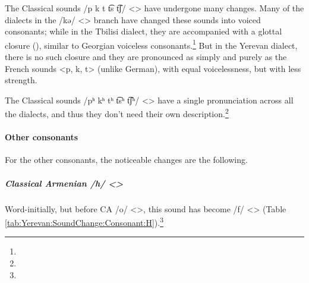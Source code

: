 The Classical sounds /p  k t t͡s t͡ʃ/ <> have undergone many changes. Many of the dialects in the /kə/ <> branch have changed these sounds into voiced consonants; while in the Tbilisi dialect, they are accompanied with a glottal closure (), similar to Georgian voiceless consonants.\footnote{} But in the Yerevan dialect, there is no such closure and they are pronounced as simply and purely as the French sounds <p, k, t> (unlike German), with equal voicelessness, but with less strength. 

The Classical sounds /pʰ kʰ tʰ t͡sʰ t͡ʃʰ/ <> have a single pronunciation across all the dialects, and thus they don't need their own description.\footnote{}

\begin{adjarianpage}\label{page:40}\end{adjarianpage}%

\paragraph{Other consonants}
For the other consonants, the noticeable changes are the following. 

\subparagraph{Classical Armenian /h/ <>}

Word-initially, but before CA /o/ <>, this sound has become /f/ <> (Table \ref{tab:Yerevan:SoundChange:Consonant:H}).\footnote{}



